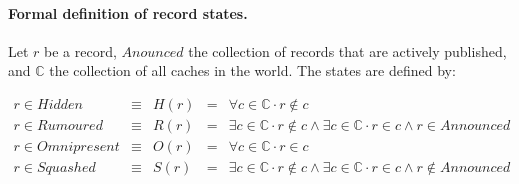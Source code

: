 \documentclass[twoside,english, a4paper]{article}
\renewcommand{\setminus}{\mathrel{\backslash}}
\begin{document}




\paragraph{Formal definition of record states.} Let $r$ be a record, $Anounced$ the 
collection of records that are actively published, and $\mathbb{C}$
the collection of all caches in the world. The states are defined by:

\begin{displaymath}
\begin{array}{lllll}
       r\in Hidden      & \equiv & H(r) &=& \forall c \in \mathbb{C} \cdot r \not \in c \\
       r\in Rumoured    & \equiv & R(r) &=& \exists c \in \mathbb{C} \cdot r \not \in c \wedge \exists c \in \mathbb{C} \cdot r\in c \wedge r\in Announced\\
       r\in Omnipresent & \equiv & O(r) &=& \forall c \in \mathbb{C} \cdot r \in c \\
       r\in Squashed    & \equiv & S(r) &=& \exists c \in \mathbb{C} \cdot r \not \in c \wedge \exists c \in \mathbb{C} \cdot r \in c \wedge r \notin Announced \\
\end{array}
\end{displaymath}
\end{document}
